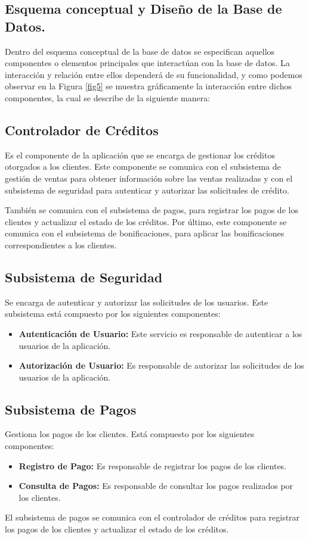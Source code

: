 \documentclass[runningheads]{llncs}
\begin{document}
        \subsection{Esquema conceptual y Diseño de la Base de Datos.}
            Dentro del esquema conceptual de la base de datos se especifican aquellos componentes o elementos principales que interactúan con la base de datos.
            La interacción y relación entre ellos dependerá de su funcionalidad, y como podemos observar en la Figura \ref{fig5} se muestra gráficamente la interacción entre dichos componentes, la cual se describe de la siguiente manera:

            \subsection*{Controlador de Créditos}
                Es el componente de la aplicación que se encarga de gestionar los créditos otorgados a los clientes. Este componente se comunica con el subsistema de gestión de ventas para obtener información sobre las ventas realizadas y con el subsistema de seguridad para autenticar y autorizar las solicitudes de crédito.

                También se comunica con el subsistema de pagos, para registrar los pagos de los clientes y actualizar el estado de los créditos. Por último, este componente se comunica con el subsistema de bonificaciones, para aplicar las bonificaciones correspondientes a los clientes.

            \subsection*{Subsistema de Seguridad}
                Se encarga de autenticar y autorizar las solicitudes de los usuarios. Este subsistema está compuesto por los siguientes componentes:
                \begin{itemize}
                    \item \textbf{Autenticación de Usuario:}  Este servicio es responsable de autenticar a los usuarios de la aplicación.
                    \item \textbf{Autorización de Usuario:} Es responsable de autorizar las solicitudes de los usuarios de la aplicación.
                \end{itemize}

            \subsection*{Subsistema de Pagos}
                Gestiona los pagos de los clientes. Está compuesto por los siguientes componentes:
                \begin{itemize}
                    \item \textbf{Registro de Pago:}  Es responsable de registrar los pagos de los clientes.
                    \item \textbf{Consulta de Pagos:} Es responsable de consultar los pagos realizados por los clientes.
                \end{itemize}
                El subsistema de pagos se comunica con el controlador de créditos para registrar los pagos de los clientes y actualizar el estado de los créditos.
\end{document}
